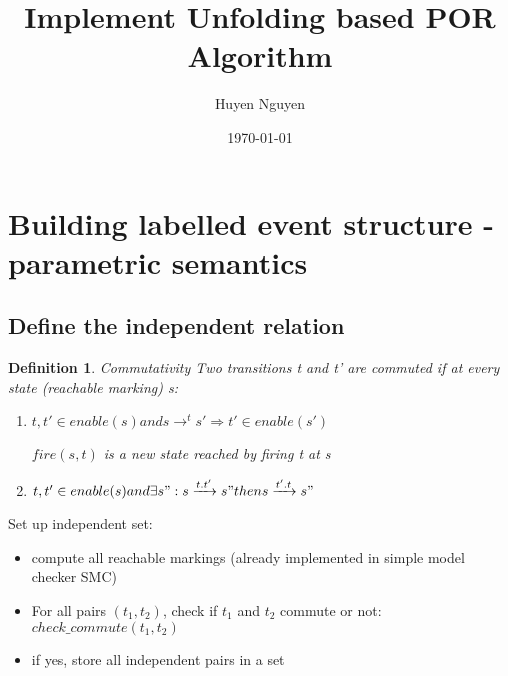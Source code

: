 \documentclass[11pt]{article}
\newtheorem{definition}{Definition}
\begin{document}
\title{Implement Unfolding based POR Algorithm}
\author{Huyen Nguyen}
\date{\today}
\maketitle

\section{Building labelled event structure - parametric semantics}
\subsection{Define the independent relation}

\begin{definition}{Commutativity}
	Two transitions t and t' are commuted if at every state (reachable marking) s:
	\begin{enumerate}
		\item $t, t'\in enable(s) and s\rightarrow ^t s' \Longrightarrow t'\in enable(s')$ 		
		
		$ fire(s,t)$ is a new state reached by firing t at s
		\item $t, t' \in enable(s) and \exists s": s\xrightarrow{t.t'} s" then s\xrightarrow{t'.t} s"$ 
		
	\end{enumerate}
\end{definition}

	Set up independent set:
	\begin{itemize}
	\item compute all reachable markings (already implemented in simple model checker SMC)
	\item For all pairs $(t_1,t_2)$, check if $t_1$ and $t_2$ commute or not: $check\_commute(t_1,t_2)$ 
	\item if yes, store all independent pairs in a set
	\end{itemize}	
	
\begin{algorithm}{}
\caption{Commutativity algorithm}\label{alg:cmt}
\begin{algorithmic}[1]
		\Else
				\Else
				\EndIf
			\EndIf
		\EndIf
	\EndFor
\EndFunction
\end{algorithmic}
\end{algorithm}
\end{document}
